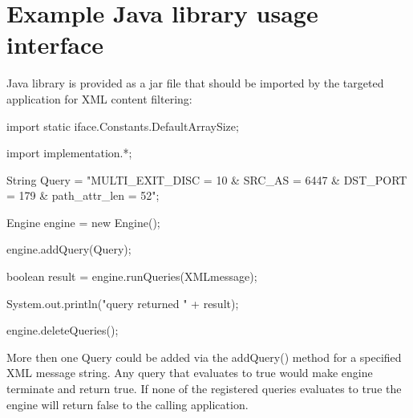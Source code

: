\documentclass[11pt]{article} %
\begin{document}
\section{Example Java library usage interface}

Java library is provided as a jar file that should be imported by the targeted application for XML content filtering:

import static iface.Constants.DefaultArraySize;

import implementation.*;

String Query = "MULTI\_EXIT\_DISC = 10 \& SRC\_AS = 6447 \& DST\_PORT = 179 \&
path\_attr\_len = 52";

Engine engine = new Engine();

engine.addQuery(Query);

boolean result = engine.runQueries(XMLmessage);
		
System.out.println("query returned " + result);

engine.deleteQueries();


More then one Query could be added via the addQuery() method for a specified XML message string. Any query that evaluates to true would make engine terminate and return true. If none of the registered queries evaluates to true the engine will return false to the calling application.   
\end{document}
